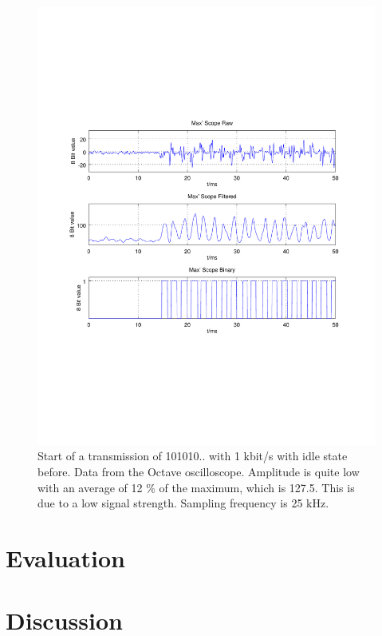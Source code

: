 \documentclass[conference]{IEEEtran}
\begin{document}
\begin{figure}[h]
\centering
\vspace{-30mm}

\includegraphics[width=\columnwidth]{./fig/transmission}
\vspace{-30mm}
\caption{Start of a transmission of 101010.. with 1 kbit/s with idle state before. Data from the Octave oscilloscope. Amplitude is quite low with an average of 12 \% of the maximum, which is 127.5. This is due to a low signal strength. Sampling frequency is 25 kHz.}
\label{fig:transmission}
\vspace{-6mm}

\end{figure}

\section{Evaluation}


\section{Discussion}
\end{document}
